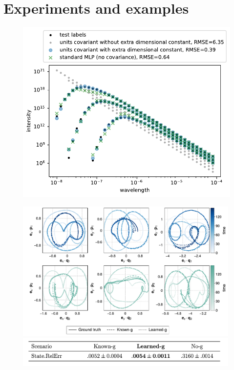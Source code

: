 \documentclass{article}
\theoremstyle{plain}
\theoremstyle{definition}
\theoremstyle{remark}
\begin{document}
\section{Experiments and examples}\label{sec:experiments}

\begin{figure}[t!]
    \centering
    \begin{minipage}{0.45\textwidth}
    \includegraphics[height=0.85\textwidth]{units}
    \end{minipage}
    \begin{minipage}{0.5\textwidth}
    \centering
    \includegraphics[width=0.99\textwidth]{pendulum}
    \includegraphics[width=0.99\textwidth]{table}

\end{minipage}
\end{figure}
\end{document}
